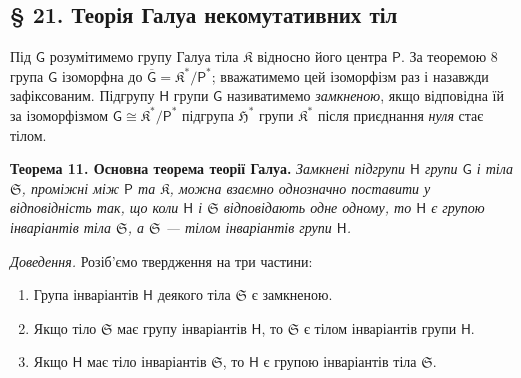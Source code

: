 \documentclass[11pt]{article}
\begin{document}
\subsection*{§ 21. Теорія Галуа некомутативних тіл}\label{die-galoissche-theorie-der-nichtkommutativen-koerper}

Під \(\mathsf{G}\) розумітимемо групу Галуа тіла \(\mathfrak K\) відносно його центра \(\mathsf P\). За теоремою 8 група \(\mathsf{G}\) ізоморфна до \(\overline{\mathsf G}=\mathfrak K^*/\mathsf P^*\); вважатимемо цей ізоморфізм раз і назавжди зафіксованим. Підгрупу \(\mathsf{H}\) групи \(\mathsf{G}\) називатимемо \emph{замкненою}, якщо відповідна їй за ізоморфізмом \(\mathsf{G}\cong\mathfrak K^*/\mathsf P^*\) підгрупа \(\mathfrak H^*\) групи \(\mathfrak K^*\) після приєднання \emph{нуля} стає тілом.


\textbf{Теорема 11. Основна теорема теорії Галуа.} \emph{Замкнені підгрупи \(\mathsf{H}\) групи \(\mathsf{G}\) і тіла \(\mathfrak S\), проміжні між \(\mathsf P\) та \(\mathfrak K\), можна взаємно однозначно поставити у відповідність так, що коли \(\mathsf{H}\) і \(\mathfrak S\) відповідають одне одному, то \(\mathsf{H}\) є групою інваріантів тіла \(\mathfrak S\), а \(\mathfrak S\) --- тілом інваріантів групи \(\mathsf{H}\).}

\emph{Доведення.} Розіб'ємо твердження на три частини:
\begin{enumerate}
\item Група інваріантів \(\mathsf{H}\) деякого тіла \(\mathfrak S\) є замкненою.
\item Якщо тіло \(\mathfrak S\) має групу інваріантів \(\mathsf{H}\), то \(\mathfrak S\) є тілом інваріантів групи \(\mathsf{H}\).
\item Якщо \(\mathsf{H}\) має тіло інваріантів \(\mathfrak S\), то \(\mathsf{H}\) є групою інваріантів тіла \(\mathfrak S\).
\end{enumerate}
\end{document}
